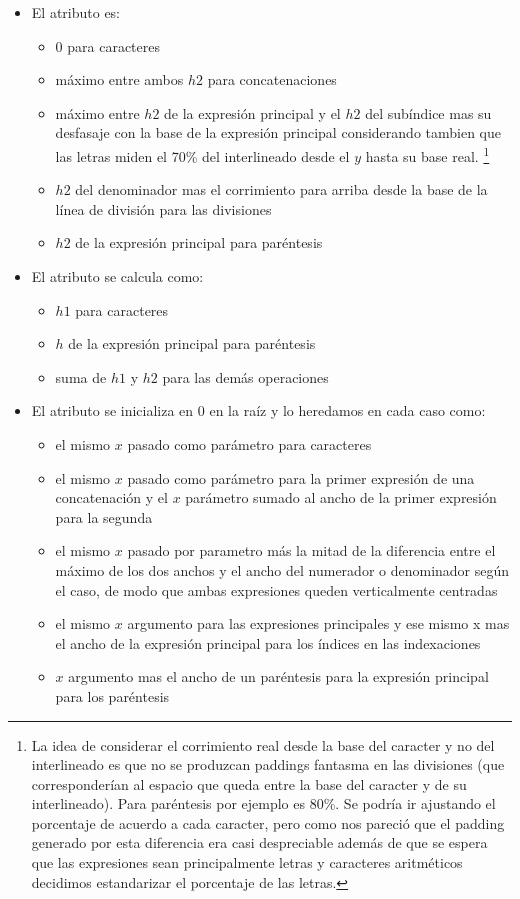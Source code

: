 \begin{itemize}
	\item El atributo \textbf{} es:
	\begin{itemize}
		\item 0 para caracteres
		\item máximo entre ambos $h2$ para concatenaciones
		\item máximo entre $h2$ de la expresión principal y el $h2$ del subíndice mas su desfasaje con la base de la expresión principal considerando tambien que las letras miden el 70\% del interlineado desde el $y$ hasta su base real. \footnote{La idea de considerar el corrimiento real desde la base del caracter y no del interlineado es que no se produzcan paddings fantasma en las divisiones (que corresponderían al espacio que queda entre la base del caracter y de su interlineado). Para paréntesis por ejemplo es 80\%. Se podría ir ajustando el porcentaje de acuerdo a cada caracter, pero como nos pareció que el padding generado por esta diferencia era casi despreciable además de que se espera que las expresiones sean principalmente letras y caracteres aritméticos decidimos estandarizar el porcentaje de las letras.}
		\item $h2$ del denominador mas el corrimiento para arriba desde la base de la línea de división para las divisiones
		\item $h2$ de la expresión principal para paréntesis
	\end{itemize}

	\item El atributo \textbf{} se calcula como:
	\begin{itemize}
		\item $h1$ para caracteres
		\item $h$ de la expresión principal para paréntesis
		\item suma de $h1$ y $h2$ para las demás operaciones
	\end{itemize}

	\item El atributo \textbf{} se inicializa en 0 en la raíz y lo heredamos en cada caso como:
	\begin{itemize}
		\item el mismo $x$ pasado como parámetro para caracteres
		\item el mismo $x$ pasado como parámetro para la primer expresión de una concatenación y el $x$ parámetro sumado al ancho de la primer expresión para la segunda
		\item el mismo $x$ pasado por parametro más la mitad de la diferencia entre el máximo de los dos anchos y el ancho del numerador o denominador según el caso, de modo que ambas expresiones queden verticalmente centradas
		\item el mismo $x$ argumento para las expresiones principales y ese mismo x mas el ancho de la expresión principal para los índices en las indexaciones
		\item $x$ argumento mas el ancho de un paréntesis para la expresión principal para los paréntesis
	\end{itemize}


\end{itemize}
